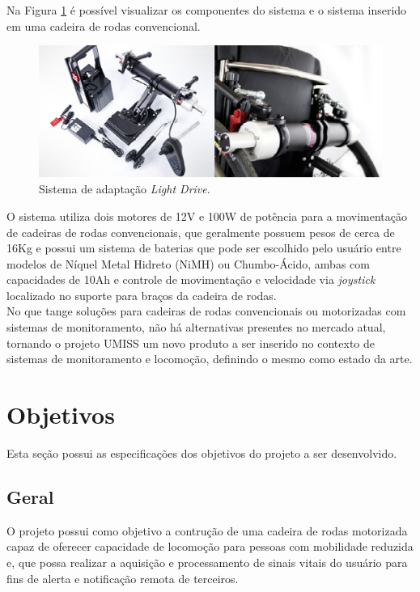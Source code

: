 Na Figura \ref{ldrive} é possível visualizar os componentes do sistema e
o sistema inserido em uma cadeira de rodas convencional.

\begin{figure}[h]
    \centering
    \label{ldrive}
    \includegraphics[keepaspectratio=true,scale=0.7]{figuras/ldrive.eps}
    \caption{Sistema de adaptação \textit{Light Drive}.}
\end{figure}

O sistema utiliza dois motores de 12V e 100W de potência para a movimentação 
de cadeiras de rodas convencionais, que geralmente possuem pesos de cerca de 16Kg 
e possui um sistema de baterias que pode ser escolhido pelo usuário entre modelos 
de Níquel Metal Hidreto  (NiMH) ou Chumbo-Ácido, ambas com capacidades de 10Ah 
e controle de movimentação e velocidade via \textit{joystick} localizado no 
suporte para braços da cadeira de rodas.\\

No que tange soluções para cadeiras de rodas convencionais ou motorizadas
com sistemas de monitoramento, não há alternativas presentes no mercado
atual, tornando o projeto UMISS um novo produto a ser inserido no contexto
de sistemas de monitoramento e locomoção, definindo o mesmo como estado da arte.

\section{Objetivos}
Esta seção possui as especificações dos objetivos do projeto a ser desenvolvido.

\subsection{Geral}
O projeto possui como objetivo a contrução de uma cadeira de rodas motorizada capaz de
oferecer capacidade de locomoção para pessoas com mobilidade reduzida
e, que possa realizar
a aquisição e processamento de sinais vitais do usuário para fins de alerta e notificação
remota de terceiros.

